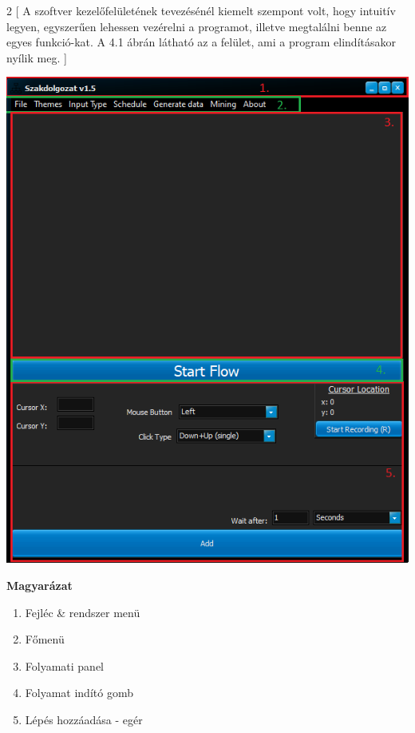 
\begin{multicols}{2}
[
A szoftver kezelőfelületének tevezésénél kiemelt szempont volt, hogy intuitív legyen, egyszerűen lehessen vezérelni a programot, illetve megtalálni benne az egyes funkció\hyp{}kat. A 4.1 ábrán látható az a felület, ami a program elindításakor nyílik meg.
]
	
	\begin{Figure}
		\centering		
		\includegraphics[width=\linewidth, keepaspectratio=true]{images/img_ui_1}	
		\label{fig:ui}
	\end{Figure}
	
	\textbf{Magyarázat}
	\begin{enumerate}
		\item{Fejléc \& rendszer menü}
		\item{Főmenü}
		\item{Folyamati panel}
		\item{Folyamat indító gomb}
		\item{Lépés hozzáadása - egér}
	\end{enumerate}

\end{multicols}


